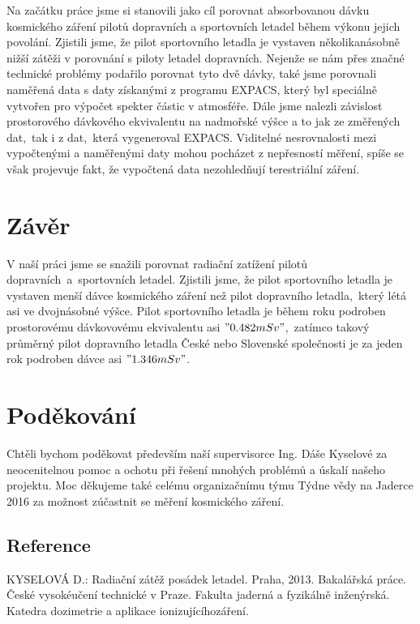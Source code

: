 \documentclass[12pt,a4paper]{article}
\begin{document}
\begin{center}
\end{center}
Na začátku práce jsme si stanovili jako cíl porovnat absorbovanou dávku
kosmického záření pilotů dopravních a sportovních letadel během výkonu jejich
povolání. Zjistili jsme, že pilot sportovního letadla je vystaven
několikanásobně nižší zátěži v porovnání s piloty letadel dopravních. Nejenže se
nám přes značné technické problémy podařilo porovnat tyto dvě dávky, také jsme
porovnali naměřená data s daty získanými z programu EXPACS, který byl speciálně
vytvořen pro výpočet spekter částic v atmosféře. Dále jsme nalezli závislost
prostorového dávkového ekvivalentu na nadmořské výšce a to jak ze změřených
dat,~tak i z dat,~která vygeneroval EXPACS. Viditelné nesrovnalosti mezi
vypočtenými a naměřenými daty mohou pocházet z nepřesností měření, spíše se
však projevuje fakt, že vypočtená data nezohledňují terestriální záření.\newpage

\section*{Závěr}
V naší práci jsme se snažili porovnat radiační zatížení pilotů
dopravních~a~sportovních letadel. Zjistili jsme, že pilot sportovního letadla je
vystaven menší dávce kosmického záření než pilot dopravního letadla,~který létá
asi ve dvojnásobné výšce. Pilot sportovního letadla je během roku podroben
prostorovému dávkovovému ekvivalentu asi $"0.482 mSv" $,~zatímco takový průměrný
pilot dopravního letadla České nebo Slovenské společnosti je za jeden rok
podroben dávce asi $"1.346 mSv"$.
\section*{Poděkování}
Chtěli bychom poděkovat především naší supervisorce Ing. Dáše Kyselové za
neocenitelnou pomoc a ochotu při řešení mnohých problémů a úskalí našeho
projektu. Moc děkujeme také celému organizačnímu týmu Týdne vědy na Jaderce
2016 za možnost zúčastnit se měření kosmického záření.
\subsection*{Reference}
\begin{thebibliography}{99}
KYSELOVÁ D.: Radiační zátěž posádek letadel. Praha, 2013. Bakalářská práce. České vysokéučení technické v Praze. Fakulta jaderná a fyzikálně inženýrská. Katedra dozimetrie a aplikace ionizujícíhozáření.
\end{thebibliography}
\end{document}

